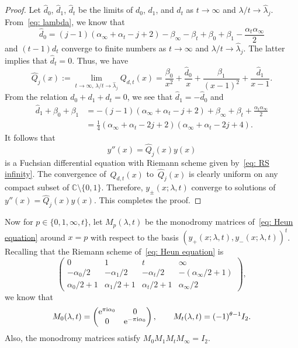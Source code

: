 \documentclass[pdftex]{sigma}
\numberwithin{equation}{section}
\def\C{\mathbb C}
\def\M#1#2#3#4{\begin{pmatrix}#1&#2\\#3&#4\end{pmatrix}}
\begin{document}
\begin{proof} Let $\hat d_0$, $\hat d_1$, $\hat d_t$ be the limits of $d_0$,
 $d_1$, and $d_t$ as $t\to\infty$ and $\lambda/t\to\hat\lambda_j$.
 From~\eqref{eq: lambda}, we know that
\[
 \hat d_0=(j-1)(\alpha_\infty+\alpha_t-j+2)
 -\beta_\infty-\beta_t+\beta_0+\beta_1-\frac{\alpha_t\alpha_\infty}2
\]
 and $(t-1)d_t$ converge to finite numbers as $t\to\infty$ and
 $\lambda/t\to\hat\lambda_j$. The latter implies that
 $\hat d_t=0$. Thus, we have
\[
 \hat Q_j(x):=\lim_{t\to\infty,\,\lambda/t\to\hat\lambda_j}Q_{d,t}(x)
 =\frac{\beta_0}{x^2}+\frac{\hat d_0}x
 +\frac{\beta_1}{(x-1)^2}+\frac{\hat d_1}{x-1}.
\]
 From the relation $d_0+d_1+d_t=0$, we see that $\hat d_1=-\hat d_0$
 and
 \begin{equation*}
 \begin{split}
 \hat d_1+\beta_0+\beta_1
 &{}=-(j-1)(\alpha_\infty+\alpha_t-j+2)+\beta_\infty+\beta_t
 +\frac{\alpha_t\alpha_\infty}2 \\
 &{}=\frac14(\alpha_\infty+\alpha_t-2j+2)
 (\alpha_\infty+\alpha_t-2j+4).
 \end{split}
 \end{equation*}
 It follows that
\[
 y''(x)=\hat Q_j(x)y(x)
\]
 is a Fuchsian differential equation with Riemann scheme
 given by~\eqref{eq: RS infinity}. The convergence of~$Q_{d,t}(x)$ to~$\hat Q_j(x)$ is clearly uniform on any compact subset of ${\C\setminus\{0,1\}}$.
 Therefore, $y_\pm(x;\lambda,t)$ converge to solutions of
 $y''(x)=\hat Q_j(x)y(x)$. This completes the proof.
\end{proof}

Now for $p\in\{0,1,\infty,t\}$, let $M_p(\lambda,t)$ be the monodromy
matrices of~\eqref{eq: Heun equation} around $x=p$ with respect to the
basis $(y_+(x;\lambda,t),y_-(x;\lambda,t))^t$.
Recalling that the Riemann scheme of~\eqref{eq: Heun equation} is
\[
\begin{pmatrix}
 0 & 1 & t & \infty \\
 -\alpha_0/2 & -\alpha_1/2 & -\alpha_t/2 & -(\alpha_\infty/2+1) \\
 \alpha_0/2+1 & \alpha_1/2+1 & \alpha_t/2+1 & \alpha_\infty/2
\end{pmatrix},
\]
we know that
\[
M_0(\lambda,t)=\M{{\rm e}^{\pi {\rm i}\alpha_0}}00{{\rm e}^{-\pi {\rm i}\alpha_0}}, \qquad
M_t(\lambda,t)=(-1)^{\theta-1}I_2.
\]
Also, the monodromy matrices satisfy $M_0M_1M_tM_\infty=I_2$.
\end{document}
